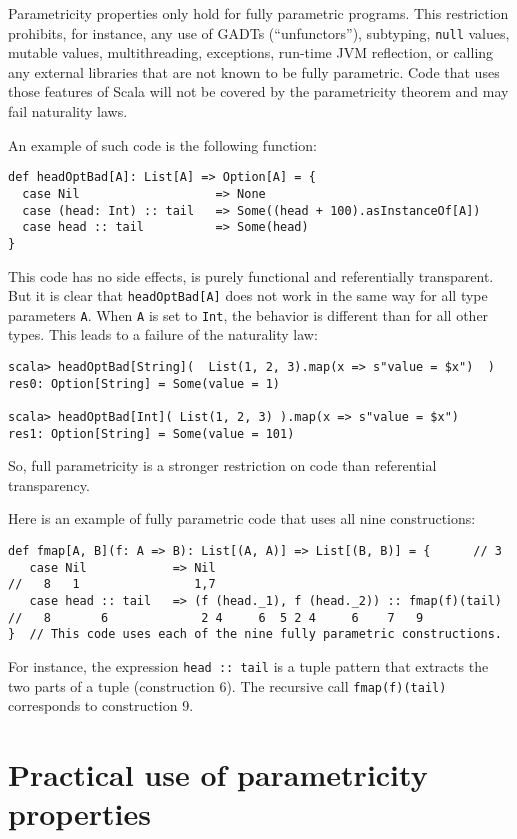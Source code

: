 Parametricity properties only hold for fully parametric programs.
This restriction prohibits, for instance, any use of GADTs
(\textsf{``}unfunctors\textsf{''}), subtyping,
\lstinline!null! values, mutable values, multithreading, exceptions,
run-time JVM reflection, or calling any external libraries that are
not known to be fully parametric. Code that uses those features of
Scala will not be covered by the parametricity theorem and may fail
naturality laws. 

An example of such code is the following function:
\begin{lstlisting}
def headOptBad[A]: List[A] => Option[A] = {
  case Nil                   => None
  case (head: Int) :: tail   => Some((head + 100).asInstanceOf[A])
  case head :: tail          => Some(head)
}
\end{lstlisting}
This code has no side effects, is purely functional and referentially
transparent. But it is clear that \lstinline!headOptBad[A]! does
not work in the same way for all type parameters \lstinline!A!. When
\lstinline!A! is set to \lstinline!Int!, the behavior is different
than for all other types. This leads to a failure of the naturality
law:
\begin{lstlisting}
scala> headOptBad[String](  List(1, 2, 3).map(x => s"value = $x")  )
res0: Option[String] = Some(value = 1)

scala> headOptBad[Int]( List(1, 2, 3) ).map(x => s"value = $x")
res1: Option[String] = Some(value = 101)
\end{lstlisting}
So, full parametricity is a stronger restriction on code than referential
transparency.

Here is an example of fully parametric code that uses all nine constructions:
\begin{lstlisting}
def fmap[A, B](f: A => B): List[(A, A)] => List[(B, B)] = {      // 3
   case Nil            => Nil
//   8   1                1,7 
   case head :: tail   => (f (head._1), f (head._2)) :: fmap(f)(tail)
//   8       6             2 4     6  5 2 4     6    7   9
}  // This code uses each of the nine fully parametric constructions.
\end{lstlisting}
For instance, the expression \lstinline!head :: tail! is a tuple
pattern that extracts the two parts of a tuple (construction 6). The
recursive call \lstinline!fmap(f)(tail)! corresponds to construction
9.

\section{Practical use of parametricity properties}

